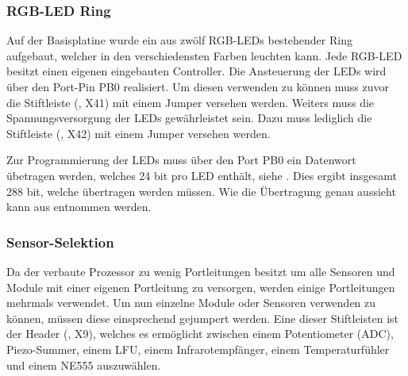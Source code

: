 
\subsubsection{RGB-LED Ring}
Auf der \gls{Basisplatine} wurde ein aus zwölf RGB-LEDs bestehender Ring aufgebaut, welcher in den verschiedensten Farben leuchten kann. Jede RGB-LED besitzt einen eigenen eingebauten Controller. Die Ansteuerung der LEDs wird über den Port-Pin PB0 realisiert. Um diesen verwenden zu können muss zuvor die Stiftleiste (, X41) mit einem Jumper versehen werden. Weiters muss die Spannungsversorgung der LEDs gewährleistet sein. Dazu muss lediglich die Stiftleiste (, X42) mit einem Jumper versehen werden.


Zur Programmierung der LEDs muss über den Port PB0 ein Datenwort übetragen werden, welches 24 bit pro LED enthält, siehe . Dies ergibt insgesamt 288 bit, welche übertragen werden müssen. Wie die Übertragung genau aussieht kann aus  entnommen werden.


\subsubsection{Sensor-Selektion}
Da der verbaute Prozessor zu wenig Portleitungen besitzt um alle Sensoren und Module mit einer eigenen Portleitung zu versorgen, werden einige Portleitungen mehrmals verwendet. Um nun einzelne Module oder Sensoren verwenden zu können, müssen diese einsprechend gejumpert werden. Eine dieser Stiftleisten ist der Header (, X9), welches es ermöglicht zwischen einem Potentiometer (ADC), Piezo-Summer, einem LFU, einem Infrarotempfänger, einem Temperaturfühler und einem NE555 auszuwählen.

